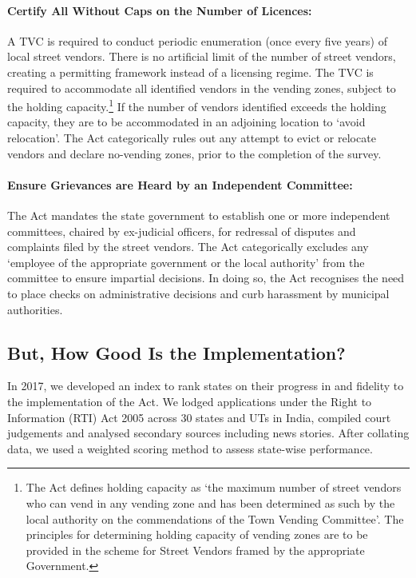 \documentclass[a4paper, 12pt, twoside, table]{article}
\begin{document}
{\paragraph*{Certify All Without Caps on the Number of Licences:} A TVC is required to conduct periodic enumeration (once every five years) of local street vendors. There is no artificial limit of the number of street vendors, creating a permitting framework instead of a licensing regime. The TVC is required to accommodate all identified vendors in the vending zones, subject to the holding capacity.\footnote{ The Act defines holding capacity as `the maximum number of street vendors who can vend in any vending zone and has been determined as such by the local authority on the commendations of the Town Vending Committee'. The principles for determining holding capacity of vending zones are to be provided in the scheme for Street Vendors framed by the appropriate Government.} If the number of vendors identified exceeds the holding capacity, they are to be accommodated in an adjoining location to `avoid relocation'. The Act categorically rules out any attempt to evict or relocate vendors and declare no-vending zones, prior to the completion of the survey.

\paragraph{Ensure Grievances are Heard by an Independent Committee:} The Act mandates the state government to establish one or more independent committees, chaired by ex-judicial officers, for redressal of disputes and complaints filed by the street vendors. The Act categorically excludes any `employee of the appropriate government or the local authority' from the committee to ensure impartial decisions. In doing so, the Act recognises the need to place checks on administrative decisions and curb harassment by municipal authorities.

\subsection*{But, How Good Is the Implementation?}

In 2017, we developed an index to rank states on their progress in and fidelity to the implementation of the Act. We lodged applications under the Right to Information (RTI) Act 2005 across 30 states and UTs in India, compiled court judgements and analysed secondary sources including news stories. After collating data, we used a weighted scoring method to assess state-wise performance.

}
\end{document}
